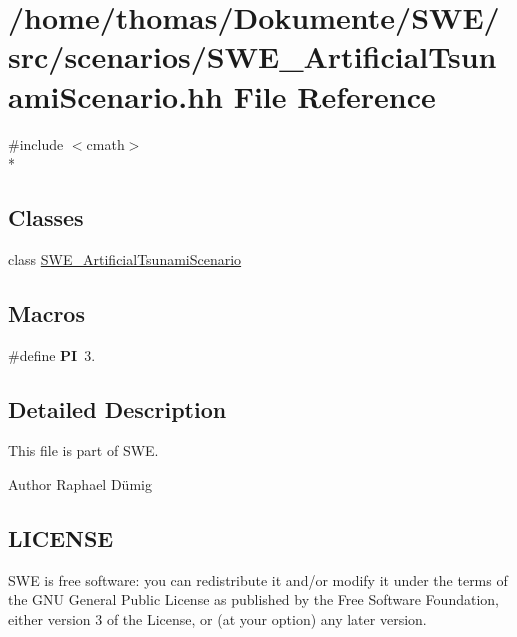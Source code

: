 \hypertarget{SWE__ArtificialTsunamiScenario_8hh}{\section{/home/thomas/\-Dokumente/\-S\-W\-E/src/scenarios/\-S\-W\-E\-\_\-\-Artificial\-Tsunami\-Scenario.hh File Reference}
\label{SWE__ArtificialTsunamiScenario_8hh}
}
{\ttfamily \#include $<$cmath$>$}\\*
\subsection*{Classes}
\begin{DoxyCompactItemize}
\item 
class \hyperlink{classSWE__ArtificialTsunamiScenario}{S\-W\-E\-\_\-\-Artificial\-Tsunami\-Scenario}
\end{DoxyCompactItemize}
\subsection*{Macros}
\begin{DoxyCompactItemize}
\item 
\hypertarget{SWE__ArtificialTsunamiScenario_8hh_a598a3330b3c21701223ee0ca14316eca}{\#define {\bfseries P\-I}~3.}\label{SWE__ArtificialTsunamiScenario_8hh_a598a3330b3c21701223ee0ca14316eca}

\end{DoxyCompactItemize}


\subsection{Detailed Description}
This file is part of S\-W\-E.

\begin{DoxyAuthor}{Author}
Raphael Dümig
\end{DoxyAuthor}
\hypertarget{Writer_8hh_LICENSE}{}\subsection{L\-I\-C\-E\-N\-S\-E}\label{Writer_8hh_LICENSE}
S\-W\-E is free software\-: you can redistribute it and/or modify it under the terms of the G\-N\-U General Public License as published by the Free Software Foundation, either version 3 of the License, or (at your option) any later version.

